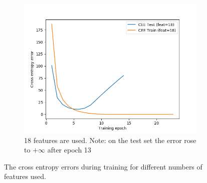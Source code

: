 \documentclass[a4paper,11pt]{article}
\begin{document}
\begin{figure}
\begin{subfigure}[b]{0.5\textwidth}
		\includegraphics[width=\textwidth]{images/irls_cee-18.png}
		\caption{18 features are used. Note: on the test set the error rose to $+\infty$ after epoch 13}
		\label{irls:cee_18}
	\end{subfigure}
	\caption{The cross entropy errors during training for different numbers of features used.}
	\label{irls:cee}
\end{figure} 
\end{document}
